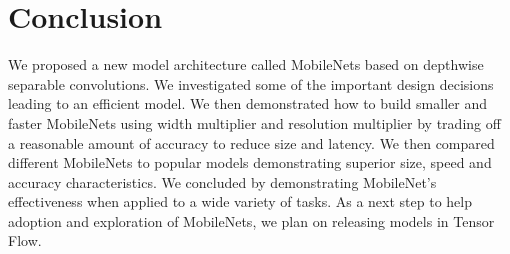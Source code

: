 \documentclass[10pt,twocolumn,letterpaper]{article}
\begin{document}
\section{Conclusion} \label{sec:conclusion}

We proposed a new model architecture called MobileNets based on depthwise separable convolutions. We investigated some of the important design decisions leading to an efficient model. We then demonstrated how to build smaller and faster MobileNets using width multiplier and resolution multiplier by trading off a reasonable amount of accuracy to reduce size and latency. We then compared different MobileNets to popular models demonstrating superior size, speed and accuracy characteristics. We concluded by demonstrating MobileNet's effectiveness when applied to a wide variety of tasks. As a next step to help adoption and exploration of MobileNets, we plan on releasing models in Tensor Flow.

{\small


}
\end{document}
